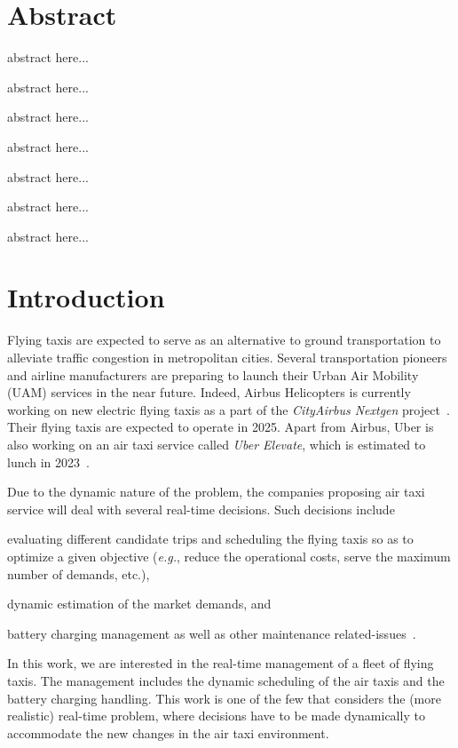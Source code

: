 

\section*{Abstract}

abstract here...

abstract here...

abstract here...

abstract here...

abstract here...

abstract here...

abstract here...



\section{Introduction}


Flying taxis are expected to serve as an alternative to ground transportation to alleviate traffic congestion in metropolitan cities. Several transportation pioneers and airline manufacturers are preparing to launch their Urban Air Mobility (\acs{UAM}) services in the near future. Indeed, Airbus Helicopters is currently working on new electric flying taxis as a part of the \textit{CityAirbus Nextgen} project~\cite{airbus2025}. Their flying taxis are expected to operate in 2025. Apart from Airbus, Uber is also working on an air taxi service called \textit{Uber Elevate}, which is estimated to lunch in 2023~\cite{rajendran2019}.

Due to the dynamic nature of the problem, the companies proposing air taxi service will deal with several real-time decisions. Such decisions include
\begin{enumerate*}[label=(\roman*)]
	\item evaluating different candidate trips and scheduling the flying taxis so as to optimize a given objective (\textit{e.g.}, reduce the operational costs, serve the maximum number of demands, etc.),
	\item dynamic estimation of the market demands, and
	
	\item battery charging management as well as other maintenance related-issues~\cite{rajendran2020}.
\end{enumerate*}

In this work, we are interested in the real-time management of a fleet of flying taxis. The management includes the dynamic scheduling of the air taxis and the battery charging handling. This work is one of the few that considers the (more realistic) real-time problem, where decisions have to be made dynamically to accommodate the new changes in the air taxi environment. 

